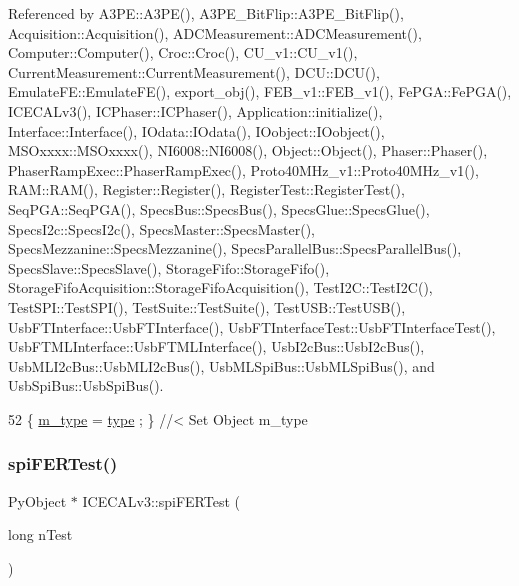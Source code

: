 Referenced by A3\+P\+E\+::\+A3\+P\+E(), A3\+P\+E\+\_\+\+Bit\+Flip\+::\+A3\+P\+E\+\_\+\+Bit\+Flip(), Acquisition\+::\+Acquisition(), A\+D\+C\+Measurement\+::\+A\+D\+C\+Measurement(), Computer\+::\+Computer(), Croc\+::\+Croc(), C\+U\+\_\+v1\+::\+C\+U\+\_\+v1(), Current\+Measurement\+::\+Current\+Measurement(), D\+C\+U\+::\+D\+C\+U(), Emulate\+F\+E\+::\+Emulate\+F\+E(), export\+\_\+obj(), F\+E\+B\+\_\+v1\+::\+F\+E\+B\+\_\+v1(), Fe\+P\+G\+A\+::\+Fe\+P\+G\+A(), I\+C\+E\+C\+A\+Lv3(), I\+C\+Phaser\+::\+I\+C\+Phaser(), Application\+::initialize(), Interface\+::\+Interface(), I\+Odata\+::\+I\+Odata(), I\+Oobject\+::\+I\+Oobject(), M\+S\+Oxxxx\+::\+M\+S\+Oxxxx(), N\+I6008\+::\+N\+I6008(), Object\+::\+Object(), Phaser\+::\+Phaser(), Phaser\+Ramp\+Exec\+::\+Phaser\+Ramp\+Exec(), Proto40\+M\+Hz\+\_\+v1\+::\+Proto40\+M\+Hz\+\_\+v1(), R\+A\+M\+::\+R\+A\+M(), Register\+::\+Register(), Register\+Test\+::\+Register\+Test(), Seq\+P\+G\+A\+::\+Seq\+P\+G\+A(), Specs\+Bus\+::\+Specs\+Bus(), Specs\+Glue\+::\+Specs\+Glue(), Specs\+I2c\+::\+Specs\+I2c(), Specs\+Master\+::\+Specs\+Master(), Specs\+Mezzanine\+::\+Specs\+Mezzanine(), Specs\+Parallel\+Bus\+::\+Specs\+Parallel\+Bus(), Specs\+Slave\+::\+Specs\+Slave(), Storage\+Fifo\+::\+Storage\+Fifo(), Storage\+Fifo\+Acquisition\+::\+Storage\+Fifo\+Acquisition(), Test\+I2\+C\+::\+Test\+I2\+C(), Test\+S\+P\+I\+::\+Test\+S\+P\+I(), Test\+Suite\+::\+Test\+Suite(), Test\+U\+S\+B\+::\+Test\+U\+S\+B(), Usb\+F\+T\+Interface\+::\+Usb\+F\+T\+Interface(), Usb\+F\+T\+Interface\+Test\+::\+Usb\+F\+T\+Interface\+Test(), Usb\+F\+T\+M\+L\+Interface\+::\+Usb\+F\+T\+M\+L\+Interface(), Usb\+I2c\+Bus\+::\+Usb\+I2c\+Bus(), Usb\+M\+L\+I2c\+Bus\+::\+Usb\+M\+L\+I2c\+Bus(), Usb\+M\+L\+Spi\+Bus\+::\+Usb\+M\+L\+Spi\+Bus(), and Usb\+Spi\+Bus\+::\+Usb\+Spi\+Bus().


\begin{DoxyCode}
52 \{ \hyperlink{classObject_a457a600fe8c00eb1034374f75110a78c}{m\_type}  = \hyperlink{classObject_a84f99f70f144a83e1582d1d0f84e4e62}{type}  ; \} \textcolor{comment}{//< Set Object m\_type}
\end{DoxyCode}
\mbox{\label{classICECALv3_a8639cf6a44cba85b53128b5e1dc21e15}} 
\subsubsection{\texorpdfstring{spi\+F\+E\+R\+Test()}{spiFERTest()}}
{\footnotesize\ttfamily Py\+Object $\ast$ I\+C\+E\+C\+A\+Lv3\+::spi\+F\+E\+R\+Test (\begin{DoxyParamCaption}\item[{long}]{n\+Test }\end{DoxyParamCaption})}



